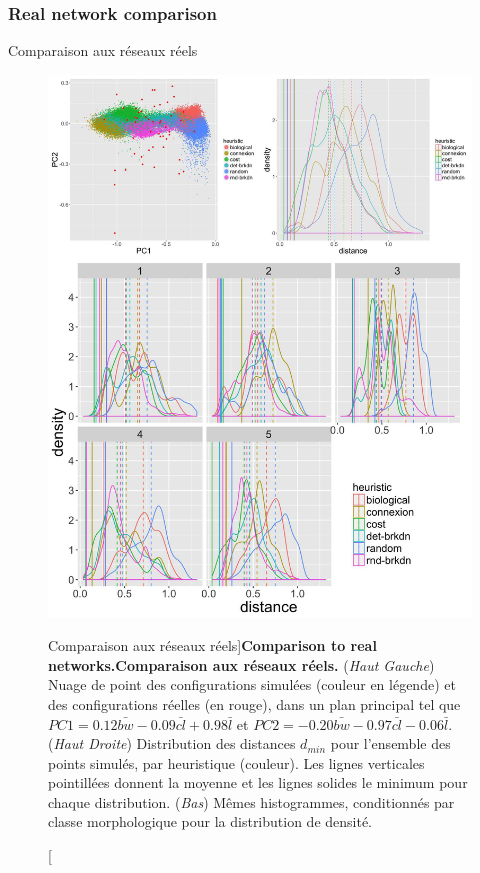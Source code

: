 \subsubsection{Real network comparison}{Comparaison aux réseaux réels}

\begin{figure}
\includegraphics[width=\linewidth,height=0.85\textheight]{Figures/Final/7-1-2-fig-networkgrowth-realdistance}
\caption[Comparison to real networks][Comparaison aux réseaux réels]{\textbf{Comparison to real networks.}\label{fig:networkgrowth:realdistance}}{\textbf{Comparaison aux réseaux réels.} (\textit{Haut Gauche}) Nuage de point des configurations simulées (couleur en légende) et des configurations réelles (en rouge), dans un plan principal tel que $PC1 = 0.12 \bar{bw} - 0.09 \bar{cl} + 0.98 \bar{l}$ et $PC2 = -0.20 \bar{bw} - 0.97 \bar{cl} - 0.06 \bar{l}$. (\textit{Haut Droite}) Distribution des distances $d_{min}$ pour l'ensemble des points simulés, par heuristique (couleur). Les lignes verticales pointillées donnent la moyenne et les lignes solides le minimum pour chaque distribution. (\textit{Bas}) Mêmes histogrammes, conditionnés par classe morphologique pour la distribution de densité.\label{fig:networkgrowth:realdistance}}
\end{figure}


